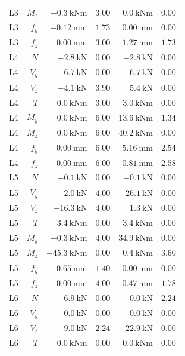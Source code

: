 \documentclass[11pt,a4paper]{article}
\begin{document}
\begin{longtable}{rrrrrr}
L3 & $M_z$ & $-0.3\ \mathrm{kNm}$ & $3.00$ & $0.0\ \mathrm{kNm}$ & $0.00$ \\
L3 & $f_y$ & $-0.12\ \mathrm{mm}$ & $1.73$ & $0.00\ \mathrm{mm}$ & $0.00$ \\
L3 & $f_z$ & $0.00\ \mathrm{mm}$ & $3.00$ & $1.27\ \mathrm{mm}$ & $1.73$ \\
L4 & $N$ & $-2.8\ \mathrm{kN}$ & $0.00$ & $-2.8\ \mathrm{kN}$ & $0.00$ \\
L4 & $V_y$ & $-6.7\ \mathrm{kN}$ & $0.00$ & $-6.7\ \mathrm{kN}$ & $0.00$ \\
L4 & $V_z$ & $-4.1\ \mathrm{kN}$ & $3.90$ & $5.4\ \mathrm{kN}$ & $0.00$ \\
L4 & $T$ & $0.0\ \mathrm{kNm}$ & $3.00$ & $3.0\ \mathrm{kNm}$ & $0.00$ \\
L4 & $M_y$ & $0.0\ \mathrm{kNm}$ & $6.00$ & $13.6\ \mathrm{kNm}$ & $1.34$ \\
L4 & $M_z$ & $0.0\ \mathrm{kNm}$ & $6.00$ & $40.2\ \mathrm{kNm}$ & $0.00$ \\
L4 & $f_y$ & $0.00\ \mathrm{mm}$ & $6.00$ & $5.16\ \mathrm{mm}$ & $2.54$ \\
L4 & $f_z$ & $0.00\ \mathrm{mm}$ & $6.00$ & $0.81\ \mathrm{mm}$ & $2.58$ \\
L5 & $N$ & $-0.1\ \mathrm{kN}$ & $0.00$ & $-0.1\ \mathrm{kN}$ & $0.00$ \\
L5 & $V_y$ & $-2.0\ \mathrm{kN}$ & $4.00$ & $26.1\ \mathrm{kN}$ & $0.00$ \\
L5 & $V_z$ & $-16.3\ \mathrm{kN}$ & $4.00$ & $1.3\ \mathrm{kN}$ & $0.00$ \\
L5 & $T$ & $3.4\ \mathrm{kNm}$ & $0.00$ & $3.4\ \mathrm{kNm}$ & $0.00$ \\
L5 & $M_y$ & $-0.3\ \mathrm{kNm}$ & $4.00$ & $34.9\ \mathrm{kNm}$ & $0.00$ \\
L5 & $M_z$ & $-45.3\ \mathrm{kNm}$ & $0.00$ & $0.4\ \mathrm{kNm}$ & $3.60$ \\
L5 & $f_y$ & $-0.65\ \mathrm{mm}$ & $1.40$ & $0.00\ \mathrm{mm}$ & $0.00$ \\
L5 & $f_z$ & $0.00\ \mathrm{mm}$ & $4.00$ & $0.47\ \mathrm{mm}$ & $1.78$ \\
L6 & $N$ & $-6.9\ \mathrm{kN}$ & $0.00$ & $0.0\ \mathrm{kN}$ & $2.24$ \\
L6 & $V_y$ & $0.0\ \mathrm{kN}$ & $0.00$ & $0.0\ \mathrm{kN}$ & $0.00$ \\
L6 & $V_z$ & $9.0\ \mathrm{kN}$ & $2.24$ & $22.9\ \mathrm{kN}$ & $0.00$ \\
L6 & $T$ & $0.0\ \mathrm{kNm}$ & $0.00$ & $0.0\ \mathrm{kNm}$ & $0.00$ \\

\end{longtable}
\end{document}
